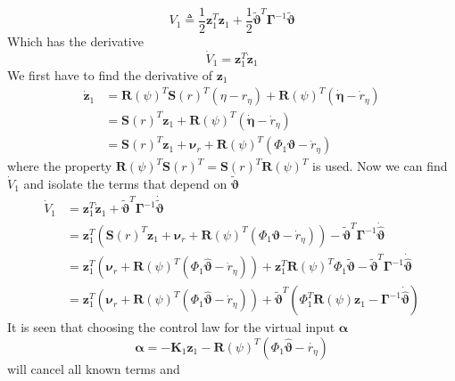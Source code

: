 \documentclass[12pt,a4]{article}
\begin{document}
\begin{equation}
	V_1 \triangleq \frac{1}{2}\bm{z}_1^T\bm{z}_1 + \frac{1}{2}\bm{\tilde{\vartheta}}^T\bm{\Gamma}^{-1}\bm{\tilde{\vartheta}}
\end{equation}
Which has the derivative
\begin{equation}
	\dot{V}_1 = \bm{z}_1^T\dot{\bm{z}}_1
\end{equation}
We first have to find the derivative of $\bm{z}_1$
\begin{align}
	\bm{\dot{z}}_1 & = \bm{R}(\psi)^T\bm{S}(r)^T(\eta - r_{\eta}) + \bm{R}(\psi)^T(\bm{\dot{\eta}} - \dot{r}_{\eta}) \\
	               & = \bm{S}(r)^T\bm{z}_1 + \bm{R}(\psi)^T(\bm{\dot{\eta}} - \dot{r}_{\eta})                        \\
	               & = \bm{S}(r)^T\bm{z}_1 + \bm{\nu}_r + \bm{R}(\psi)^T(\Phi_1\bm{\vartheta}- \dot{r}_{\eta})
\end{align}
where the property $\bm{R}(\psi)^T\bm{S}(r)^T = \bm{S}(r)^T\bm{R}(\psi)^T$ is used.
Now we can find $\dot{V}_1$ and isolate the terms that depend on $\bm{\tilde{\vartheta}}$
\begin{align}
	\dot{V}_1 & = \bm{z}_1^T\dot{\bm{z}}_1
	+ \bm{\tilde{\vartheta}} ^T\bm{\Gamma}^{-1}\bm{\dot{\tilde{\vartheta}}}                                                        \\
	          & = \bm{z}_1^T\left( \bm{S}(r)^T\bm{z}_1 + \bm{\nu}_r + \bm{R}(\psi)^T(\Phi_1\bm{\vartheta}- \dot{r}_{\eta}) \right)
	- \bm{\tilde{\vartheta}} ^T\bm{\Gamma}^{-1}\bm{\dot{\hat{\vartheta}}}                                                          \\
	          & = \bm{z}_1^T\left(\bm{\nu}_r + \bm{R}(\psi)^T(\Phi_1\bm{\hat{\vartheta}}- \dot{r}_{\eta}) \right)
	+ \bm{z}_1^T\bm{R}(\psi)^T\Phi_1\bm{\tilde{\vartheta}} - \bm{\tilde{\vartheta}} ^T\bm{\Gamma}^{-1}\bm{\dot{\hat{\vartheta}}}   \\
	          & = \bm{z}_1^T\left(\bm{\nu}_r + \bm{R}(\psi)^T(\Phi_1\bm{\hat{\vartheta}}- \dot{r}_{\eta}) \right)
	+ \bm{\tilde{\vartheta}} ^T \left( \Phi_1^T\bm{R}(\psi)\bm{z}_1 - \bm{\Gamma}^{-1}\bm{\dot{\hat{\vartheta}}}	\right)
\end{align}
It is seen that choosing the control law for the virtual input $\bm{\alpha}$
\begin{equation}
	\bm{\alpha} = -\bm{K}_1\bm{z}_1 - \bm{R}(\psi)^T  \left( \Phi_1 \bm{\hat{\vartheta}} - \dot{r_{\eta}} \right)
\end{equation}
will cancel all known terms and
\end{document}
